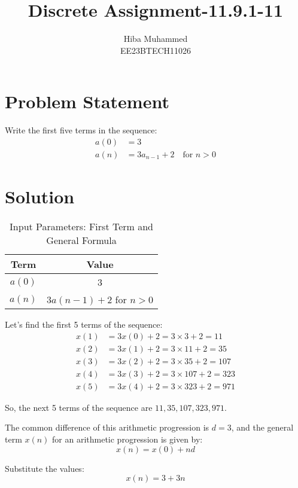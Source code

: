 \documentclass[12pt]{article}
\begin{document}
\title{Discrete Assignment-11.9.1-11}
\author{Hiba Muhammed \\
        EE23BTECH11026}
\maketitle

\section*{Problem Statement}
Write the first five terms in the sequence:
\[
\begin{aligned}
a(0)  &= 3 \\
a(n)  &= 3a_{n-1} + 2 \quad \text{for } n > 0
\end{aligned}
\]

\section*{Solution}
\begin{table}[h]
  \centering
  \caption{Input Parameters: First Term and General Formula}
  \begin{tabular}{|c|c|}
    \hline
    \textbf{Term} & \textbf{Value} \\
    \hline
    \(a(0) \) & 3 \\
    \(a(n)\) & \(3a(n-1) + 2\) for \(n > 0\) \\
    \hline
  \end{tabular}
\end{table}
Let's find the first 5 terms of the sequence:
\begin{align}
x(1) &= 3x(0)  + 2 = 3 \times 3 + 2 = 11 \\
x(2) &= 3x(1) + 2 = 3 \times 11 + 2 = 35 \\
x(3) &= 3x(2) + 2 = 3 \times 35 + 2 = 107 \\
x(4) &= 3x(3) + 2 = 3 \times 107 + 2 = 323 \\
x(5) &= 3x(4) + 2 = 3 \times 323 + 2 = 971 
\end{align}

So, the next 5 terms of the sequence are \(11, 35, 107, 323, 971\).

The common difference of this arithmetic progression is \(d = 3\), and the general term \(x(n)\) for an arithmetic progression is given by:
\[ x(n) = x(0) + nd \]

Substitute the values:
\[ x(n) = 3 + 3n \]
\end{document}
